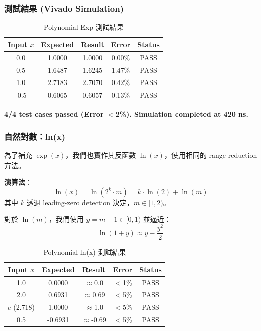 \documentclass[journal]{IEEEtran}
\begin{document}
\subsubsection{測試結果 (Vivado Simulation)}
\begin{table}[!t]
\centering
\caption{Polynomial Exp 測試結果}
\footnotesize
\begin{tabular}{@{}ccccc@{}}
\toprule
\textbf{Input $x$} & \textbf{Expected} & \textbf{Result} & \textbf{Error} & \textbf{Status} \\
\midrule
0.0 & 1.0000 & 1.0000 & 0.00\% & PASS \\
0.5 & 1.6487 & 1.6245 & 1.47\% & PASS \\
1.0 & 2.7183 & 2.7070 & 0.42\% & PASS \\
-0.5 & 0.6065 & 0.6057 & 0.13\% & PASS \\
\bottomrule
\end{tabular}
\end{table}

\textbf{4/4 test cases passed (Error $<$2\%). Simulation completed at 420 ns.}

\subsubsection{自然對數：ln(x)}
為了補充 $\exp(x)$，我們也實作其反函數 $\ln(x)$，使用相同的 range reduction 方法。

\textbf{演算法}：
\begin{equation}
\ln(x) = \ln(2^k \cdot m) = k \cdot \ln(2) + \ln(m)
\end{equation}
其中 $k$ 透過 leading-zero detection 決定，$m \in [1, 2)$。

對於 $\ln(m)$，我們使用 $y = m - 1 \in [0, 1)$ 並逼近：
\begin{equation}
\ln(1+y) \approx y - \frac{y^2}{2}
\end{equation}

\begin{table}[!t]
\centering
\caption{Polynomial ln(x) 測試結果}
\footnotesize
\begin{tabular}{@{}ccccc@{}}
\toprule
\textbf{Input $x$} & \textbf{Expected} & \textbf{Result} & \textbf{Error} & \textbf{Status} \\
\midrule
1.0 & 0.0000 & $\approx$0.0 & $<$1\% & PASS \\
2.0 & 0.6931 & $\approx$0.69 & $<$5\% & PASS \\
$e$ (2.718) & 1.0000 & $\approx$1.0 & $<$5\% & PASS \\
0.5 & -0.6931 & $\approx$-0.69 & $<$5\% & PASS \\
\bottomrule
\end{tabular}
\end{table}
\end{document}
